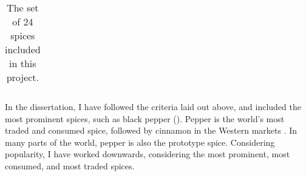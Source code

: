 \begin{table}[ht]
\begin{tabularx}{\textwidth}{@{}r>{\footnotesize}llll@{}rl@{}}
\bottomrule
\end{tabularx}
\caption[The set of 24 spices included in this project.]{The set of 24 spices included in this project.}
\label{table:set}
\end{table}

\setlength{\tabcolsep}{6pt}




In the dissertation, I have followed the criteria laid out above, and included the most prominent spices, such as black pepper (). Pepper is the world's most traded and consumed spice, followed by cinnamon in the Western markets \autocite[16]{senaratne_cinnamon_2020}. In many parts of the world, pepper is also the prototype spice. Considering popularity, I have worked downwards, considering the most prominent, most consumed, and most traded spices.


